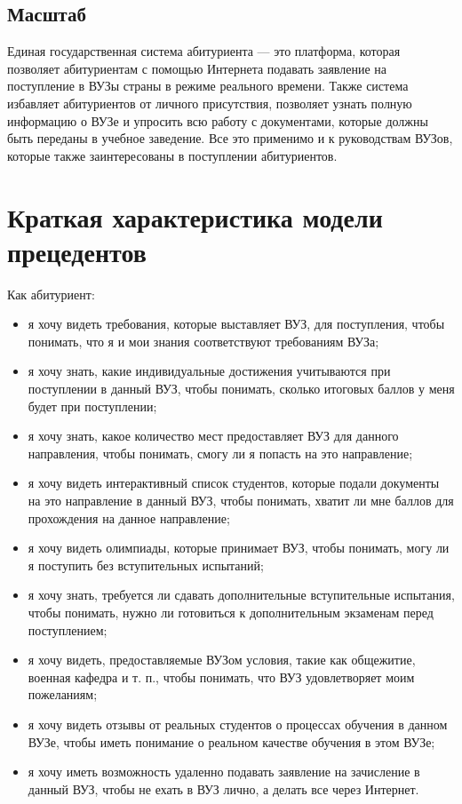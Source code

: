 \documentclass[a4paper, 14pt]{extarticle}
\begin{document}
\subsection{Масштаб}

Единая государственная система абитуриента --- это платформа, которая позволяет
абитуриентам с помощью Интернета подавать заявление на поступление в ВУЗы страны
в режиме реального времени. Также система избавляет абитуриентов от личного
присутствия, позволяет узнать полную информацию о ВУЗе и упросить всю работу с
документами, которые должны быть переданы в учебное заведение. Все это применимо
и к руководствам ВУЗов, которые также заинтересованы в поступлении абитуриентов.

\section{Краткая характеристика модели прецедентов}

Как абитуриент:
\begin{itemize}
  \item я хочу видеть требования, которые выставляет ВУЗ, для поступления, чтобы
  понимать, что я и мои знания соответствуют требованиям ВУЗа;
  \item я хочу знать, какие индивидуальные достижения учитываются при
  поступлении в данный ВУЗ, чтобы понимать, сколько итоговых баллов у меня будет
  при поступлении;
  \item я хочу знать, какое количество мест предоставляет ВУЗ для данного
  направления, чтобы понимать, смогу ли я попасть на это направление;
  \item я хочу видеть интерактивный список студентов, которые подали документы
  на это направление в данный ВУЗ, чтобы понимать, хватит ли мне баллов для
  прохождения на данное направление;
  \item я хочу видеть олимпиады, которые принимает ВУЗ, чтобы понимать, могу ли
  я поступить без вступительных испытаний;
  \item я хочу знать, требуется ли сдавать дополнительные вступительные
  испытания, чтобы понимать, нужно ли готовиться к дополнительным экзаменам
  перед поступлением;
  \item я хочу видеть, предоставляемые ВУЗом условия, такие как общежитие,
  военная кафедра и т. п., чтобы понимать, что ВУЗ удовлетворяет моим
  пожеланиям;
  \item я хочу видеть отзывы от реальных студентов о процессах обучения в данном
  ВУЗе, чтобы иметь понимание о реальном качестве обучения в этом ВУЗе;
  \item я хочу иметь возможность удаленно подавать заявление на зачисление в
  данный ВУЗ, чтобы не ехать в ВУЗ лично, а делать все через Интернет.
\end{itemize}
\end{document}

